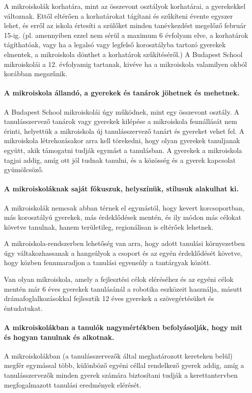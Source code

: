 A mikroiskolák korhatára, mint az összevont osztályok korhatárai, a gyerekekkel
változnak. Ettől eltérően a korhatárokat tágítani és szűkíteni évente egyszer
lehet, és
erről az iskola értesíti a szülőket minden tanévkezdést megelőző február 15-ig.
(pl. amennyiben ezzel nem sérül a maximum 6 évfolyam elve, a korhatárok
tágíthatóak, vagy ha a legalsó vagy legfelső korosztályba tartozó gyerekek
elmentek, a mikroiskola dönthet a korhatárok szűkítéséről.)
A Budapest School mikroiskolái a 12. évfolyamig tartanak, kivéve ha a
mikroiskola valamilyen okból korábban megszűnik.

\paragraph{A mikroiskola állandó, a gyerekek és tanárok jöhetnek és mehetnek.}
A Budapest School mikroiskolái úgy működnek, mint egy összevont osztály. A
tanulásszervező tanárok vagy gyerekek kilépése a mikroiskola fennállását nem
érinti, helyettük a mikroiskola új tanulásszervező tanárt és
gyereket vehet fel.  A mikroiskola létrehozásakor arra kell törekedni, hogy
olyan
gyerekek tanuljanak együtt, akik támogatni tudják egymást a tanulásban. A
gyerekek a mikroiskola tagjai addig, amíg ott jól tudnak tanulni, és a közösség
és a gyerek kapcsolat gyümölcsöző.

\paragraph{A mikroiskoláknak saját fókuszuk, helyszínük, stílusuk alakulhat
      ki.}
A mikroiskolák nemcsak abban térnek el egymástól, hogy kevert korcsoportban,
más korosztályú gyerekek, más érdeklődések mentén, és ily módon más célokat
követve tanulnak, hanem területileg, regionálisan is eltérőek lehetnek.

A mikroiskola-rendszerben lehetőség van arra, hogy adott tanulási környezetben
úgy váltakozhassanak a hangsúlyok a csoport és az egyén érdeklődését követve,
hogy közben
fennmaradjon a tanulási egyensúly a tantárgyak között.

Van olyan mikroiskola, amely a fejlesztési célok eléréséhez és az egyéni célok
mentén már 6 éves gyerekek tanulásánál a robotika eszközeit használja, másutt
drámafoglalkozásokkal fejlesztik 12 éves gyerekek a szövegértésüket és
éntudatukat.



\paragraph{A mikroiskolákban a tanulók nagymértékben befolyásolják, hogy mit és
      hogyan
      tanulnak és alkotnak.}
A mikroiskolákban (a tanulásszervezők által meghatározott kereteken belül)
megfér egymással több, különböző egyéni céllal rendelkező gyerek addig, amíg a
tanulásszervezők minden gyerek számára biztosítani tudják a kerettantervben
megfogalmazott tanulási eredmények elérését.

